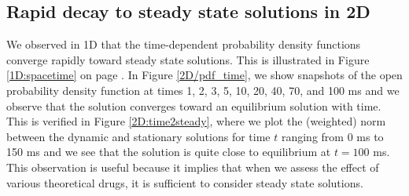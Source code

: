\subsection{Rapid decay to steady state solutions in 2D}
\label{rapid2D}

We observed in 1D that the time-dependent probability density functions
converge rapidly toward steady state solutions. This is illustrated in Figure \ref{1D:spacetime} on page \pageref{1D/spacetime}.  In Figure  \ref{2D/pdf_time}, we show snapshots of the open probability density function at times 1, 2, 3, 5, 10, 20, 40, 70, and 100 ms and we observe that the solution converges toward an equilibrium solution with time. 
This is verified in Figure \ref{2D:time2steady}, where we plot the (weighted) norm between the dynamic and stationary solutions for time $t$ ranging from 0 ms to 150 ms and we see that the solution is quite close to equilibrium at $t=100$ ms. This observation is useful because it implies that when we assess the effect of various theoretical drugs, it is sufficient to consider steady state solutions. 

